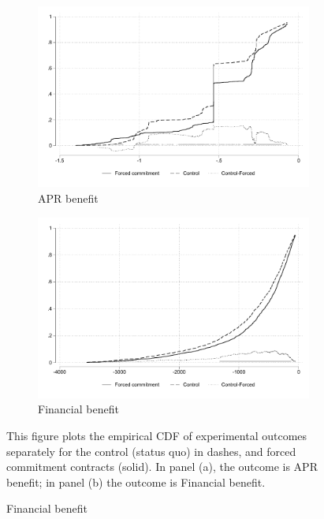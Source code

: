  
\vspace{.2in}
\begin{figure}[H]
        \caption{Empirical CDF: Forced commitment vs Control FOSF}
    \label{ecdf_fc}
    
    \begin{center}
        \begin{subfigure}{0.49\textwidth}
         \caption{APR benefit}
         \centering
         \includegraphics[width=\textwidth]{Figuras/cdf_apr.pdf}
     \end{subfigure} 
   \begin{subfigure}{0.49\textwidth}
        \caption{Financial benefit}
        \centering
        \includegraphics[width=\textwidth]{Figuras/cdf_fc_admin.pdf}
    \end{subfigure} 
    \end{center}
    \scriptsize This figure plots the empirical CDF of experimental outcomes separately for the control (status quo) in dashes, and forced commitment contracts (solid). In panel (a), the outcome is APR benefit; in panel (b) the outcome is Financial benefit. 

\end{figure}
